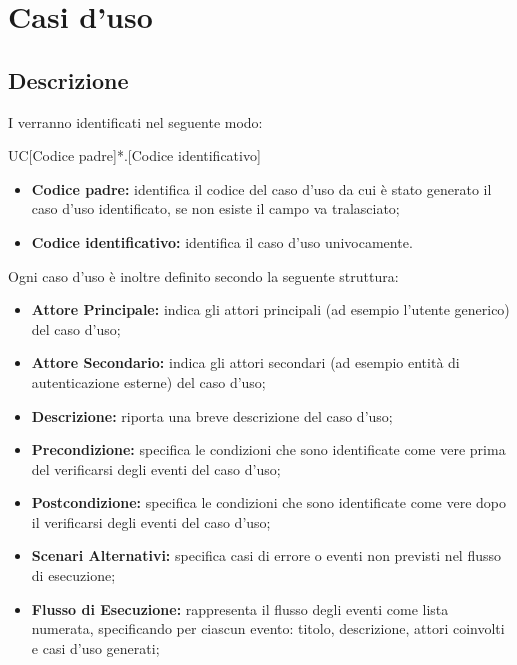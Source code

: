 \documentclass[../AnalisideiRequisiti.tex]{subfiles}
\begin{document}

	\chapter{Casi d'uso}
	\section{Descrizione}
	I  verranno identificati nel seguente modo: 
	
	\begin{center}
		UC[Codice padre]*.[Codice identificativo]
	\end{center}
	
	\begin{itemize}
		\item \textbf{Codice padre:} identifica il codice del caso d'uso da cui è stato generato il caso d'uso identificato, se non esiste il campo va tralasciato;
		\item \textbf{Codice identificativo:} identifica il caso d'uso univocamente.
	\end{itemize}
	
	\noindent Ogni caso d'uso è inoltre definito secondo la seguente struttura:
	\begin{itemize}
		\item \textbf{Attore Principale:} indica gli attori principali (ad esempio l'utente generico) del caso d'uso;
		\item \textbf{Attore Secondario:} indica gli attori secondari (ad esempio entità di autenticazione esterne) del caso d'uso;
		\item \textbf{Descrizione:} riporta una breve descrizione del caso d'uso;
		\item \textbf{Precondizione:} specifica le condizioni che sono identificate come vere prima del verificarsi degli eventi del caso d'uso;
		\item \textbf{Postcondizione:} specifica le condizioni che sono identificate come vere dopo il verificarsi degli eventi del caso d'uso;

		\item \textbf{Scenari Alternativi:} specifica casi di errore o eventi non previsti nel flusso di esecuzione;
		\item \textbf{Flusso di Esecuzione:} rappresenta il flusso degli eventi come lista numerata, specificando per ciascun evento: titolo, descrizione, attori coinvolti e casi d'uso generati;
	\end{itemize}
\end{document}
